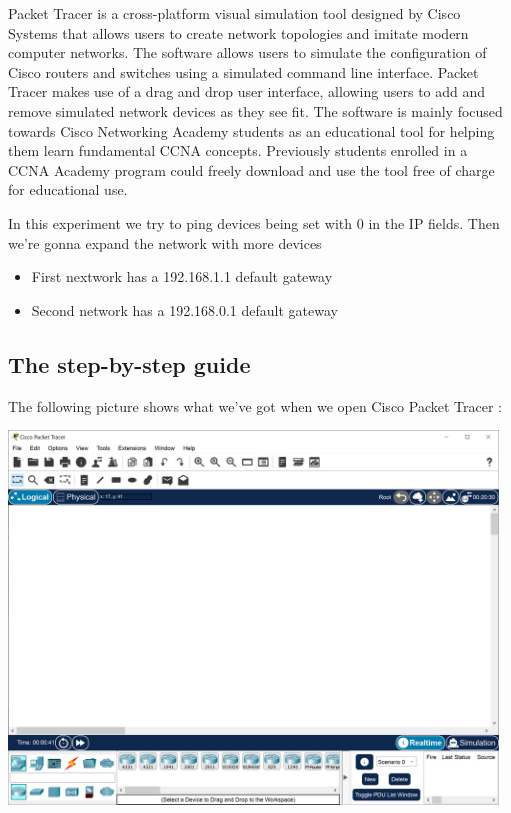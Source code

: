 \documentclass[a4paper,12pt]{article}
\begin{document}
Packet Tracer is a cross-platform visual simulation tool designed by Cisco Systems that allows users to create network topologies and imitate modern computer networks. The software allows users to simulate the configuration of Cisco routers and switches using a simulated command line interface. Packet Tracer makes use of a drag and drop user interface, allowing users to add and remove simulated network devices as they see fit. The software is mainly focused towards Cisco Networking Academy students as an educational tool for helping them learn fundamental CCNA concepts. Previously students enrolled in a CCNA Academy program could freely download and use the tool free of charge for educational use.\footnotemark{} \newline

In this experiment we try to ping devices being set with 0 in the IP fields. Then we're gonna expand the network with more devices


\begin{itemize}
\item{First nextwork has a 192.168.1.1 default gateway}
\item{Second network has a 192.168.0.1 default gateway}
\end{itemize}

\clearpage

\subsection{The step-by-step guide}

The following picture shows what we've got when we open Cisco Packet Tracer : \newline

\noindent \includegraphics[width=13cm]{./step-by-step/0.PNG}
\clearpage
\end{document}
